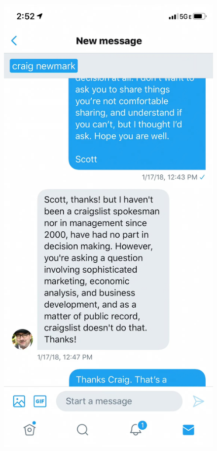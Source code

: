 \documentclass{beamer}
\begin{document}
\begin{frame}[shrink=20]
    \centering
    \begin{center}
    \begin{figure}
        \includegraphics[width=\textwidth]{./lecture_includes/craig_dm}
    \end{figure}
    \end{center}
    
    \vspace{0.5cm} %

    
\end{frame}
\end{document}
